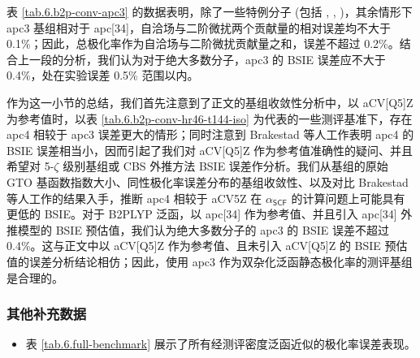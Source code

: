 表 \ref{tab.6.b2p-conv-apc3} 的数据表明，除了一些特例分子 (包括 , , )，其余情形下 apc3 基组相对于 apc[34]，自洽场与二阶微扰两个贡献量的相对误差均不大于 0.1\%；因此，总极化率作为自洽场与二阶微扰贡献量之和，误差不超过 0.2\%。结合上一段的分析，我们认为对于绝大多数分子，apc3 的 BSIE 误差应不大于 0.4\%，处在实验误差 0.5\% 范围以内。

作为这一小节的总结，我们首先注意到了正文的基组收敛性分析中，以 aCV[Q5]Z 为参考值时，以表 \ref{tab.6.b2p-conv-hr46-t144-iso} 为代表的一些测评基准下，存在 apc4 相较于 apc3 误差更大的情形；同时注意到 Brakestad 等人工作\cite{Brakestad-Frediani.JCTC.2020}表明 apc4 的 BSIE 误差相当小，因而引起了我们对 aCV[Q5]Z 作为参考值准确性的疑问、并且希望对 5-$\zeta$ 级别基组或 CBS 外推方法 BSIE 误差作分析。我们从基组的原始 GTO 基函数指数大小、同性极化率误差分布的基组收敛性、以及对比 Brakestad 等人工作\cite{Brakestad-Frediani.JCTC.2020}的结果入手，推断 apc4 相较于 aCV5Z 在 $\alpha_\textsf{SCF}$ 的计算问题上可能具有更低的 BSIE。对于 B2PLYP 泛函，以 apc[34] 作为参考值、并且引入 apc[34] 外推模型的 BSIE 预估值，我们认为绝大多数分子的 apc3 的 BSIE 误差不超过 0.4\%。这与正文中以 aCV[Q5]Z 作为参考值、且未引入 aCV[Q5]Z 的 BSIE 预估值的误差分析结论相仿；因此，使用 apc3 作为双杂化泛函静态极化率的测评基组是合理的。

\subsubsection{其他补充数据}

\begin{itemize}[nosep]
    \item 表 \ref{tab.6.full-benchmark} 展示了所有经测评密度泛函近似的极化率误差表现。
\end{itemize}

\newpage

